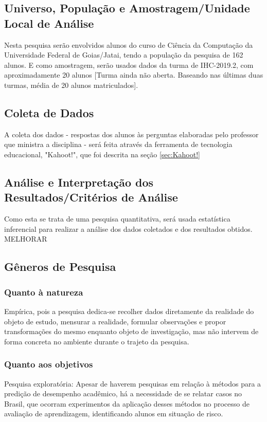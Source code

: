 \documentclass[
	12pt,				%
	openright,			%
	oneside,
	a4paper,			%
	english,			%
	french,				%
	spanish,			%
	brazil,				%
	]{abntex2}
\begin{document}
\subsection{Universo, População e Amostragem/Unidade Local de Análise}
Nesta pesquisa serão envolvidos alunos do curso de Ciência da Computação da Universidade Federal de Goias/Jatai, tendo a população da pesquisa de 162 alunos. E como amostragem, serão usados dados da turma de IHC-2019.2, com aproximadamente 20 alunos {\color{red}[Turma ainda não aberta. Baseando nas últimas duas turmas, média de 20 alunos matriculados]}.

\subsection{Coleta de Dados}
A coleta dos dados - respostas dos alunos às perguntas elaboradas pelo professor que ministra a disciplina - será feita através da ferramenta de tecnologia educacional, "Kahoot!", que foi descrita na seção \ref{sec:Kahoot!}

\subsection{Análise e Interpretação dos Resultados/Critérios de Análise}
Como esta se trata de uma pesquisa quantitativa, será usada estatística inferencial para realizar a análise dos dados coletados e dos resultados obtidos.
{\color{red}MELHORAR}

\subsection{Gêneros de Pesquisa}
\subsubsection{Quanto à natureza}
Empírica, pois a pesquisa dedica-se recolher dados diretamente da realidade do objeto de estudo, mensurar a realidade, formular observações e propor transformações do mesmo enquanto objeto de investigação, mas não intervem de forma concreta no ambiente durante o trajeto da pesquisa.

\subsubsection{Quanto aos objetivos}
Pesquisa exploratória: Apesar de haverem pesquisas em relação à métodos para a predição de desempenho acadêmico, há a necessidade de se relatar casos no Brasil, que ocorram experimentos da aplicação desses métodos no processo de avaliação de aprendizagem, identificando alunos em situação de risco.
\end{document}
